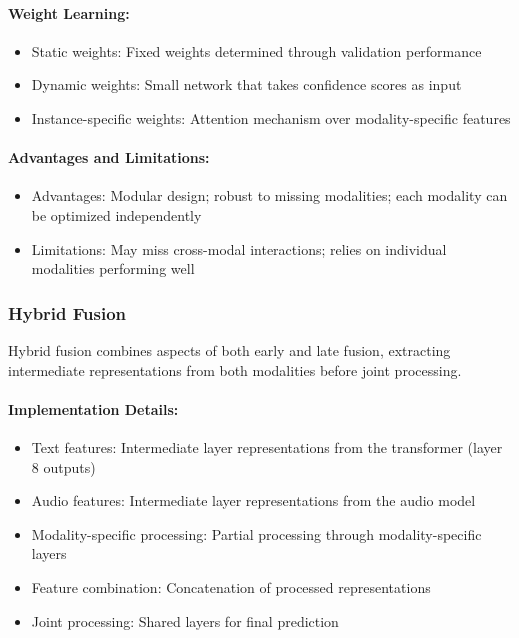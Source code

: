 \documentclass[12pt]{article}
\begin{document}
\paragraph{Weight Learning:}
\begin{itemize}
    \item Static weights: Fixed weights determined through validation performance
    \item Dynamic weights: Small network that takes confidence scores as input
    \item Instance-specific weights: Attention mechanism over modality-specific features
\end{itemize}

\paragraph{Advantages and Limitations:}
\begin{itemize}
    \item Advantages: Modular design; robust to missing modalities; each modality can be optimized independently
    \item Limitations: May miss cross-modal interactions; relies on individual modalities performing well
\end{itemize}

\subsubsection{Hybrid Fusion}
Hybrid fusion combines aspects of both early and late fusion, extracting intermediate representations from both modalities before joint processing.

\paragraph{Implementation Details:}
\begin{itemize}
    \item Text features: Intermediate layer representations from the transformer (layer 8 outputs)
    \item Audio features: Intermediate layer representations from the audio model
    \item Modality-specific processing: Partial processing through modality-specific layers
    \item Feature combination: Concatenation of processed representations
    \item Joint processing: Shared layers for final prediction
\end{itemize}
\end{document}
